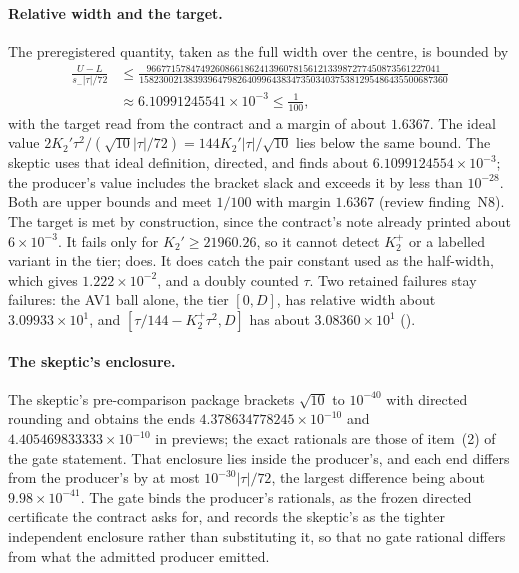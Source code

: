 \paragraph{Relative width and the target.}
The preregistered quantity, taken as the full width over the centre, is
bounded by
\begin{equation}
 \begin{aligned}
 \frac{U-L}{s_-|\tau|/72}&\le\frac{966771578474926086618624139607815612133987277450873561227041}{158230021383939647982640996438347350340375381295486435500687360}\\
 &\approx6.10991245541\times10^{-3}\le\frac1{100},
 \end{aligned}
 \label{eq:ay2-width}
\end{equation}
with the target read from the contract and a margin of about $1.6367$. The
ideal value $2K_2'\tau^2/(\sqrt{10}|\tau|/72)=144K_2'|\tau|/\sqrt{10}$ lies
below the same bound. The skeptic uses that ideal definition, directed, and
finds about $6.1099124554\times10^{-3}$; the producer's value includes the
bracket slack and exceeds it by less than $10^{-28}$. Both are upper bounds
and meet $1/100$ with margin $1.6367$ (review finding~N8). The target is met
by construction, since the contract's note already printed about
$6\times10^{-3}$. It fails only for $K_2'\ge21960.26$, so it cannot detect
$K_2^+$ or a labelled variant in the tier; 
does. It does catch the pair constant used as the half-width, which gives
$1.222\times10^{-2}$, and a doubly counted $\tau$. Two retained failures stay
failures: the AV1 ball alone, the tier $[0,D]$, has relative width about
$3.09933\times10^{1}$, and $[\tau/144-K_2^+\tau^2,D]$ has about
$3.08360\times10^{1}$
().

\paragraph{The skeptic's enclosure.}
The skeptic's pre-comparison package brackets $\sqrt{10}$ to $10^{-40}$ with
directed rounding and obtains the ends $4.378634778245\times10^{-10}$ and
$4.405469833333\times10^{-10}$ in previews; the exact rationals are those of
item~(2) of the gate statement. That enclosure lies inside the producer's,
and each end differs from the producer's by at most $10^{-30}|\tau|/72$, the
largest difference being about $9.98\times10^{-41}$. The gate binds the
producer's rationals, as the frozen directed certificate the contract asks
for, and records the skeptic's as the tighter independent enclosure rather
than substituting it, so that no gate rational differs from what the
admitted producer emitted.

